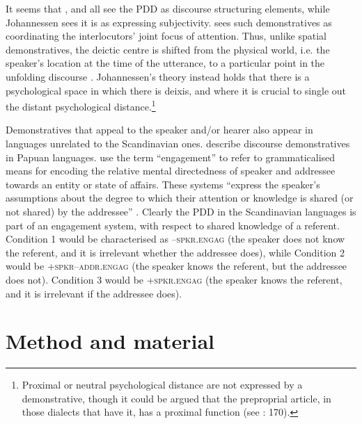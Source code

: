 \documentclass[output=paper,colorlinks,citecolor=brown]{langscibook}
\begin{document}
It seems that \citet{Himmelmann1996}, \citet{Diessel1999Book} and \citet{Lie2008,Lie2010} all see the PDD as discourse structuring elements, while Johannessen sees it is as expressing subjectivity. \citet{Diessel2006} sees such demonstratives as coordinating the interlocutors’ joint focus of attention. Thus, unlike spatial demonstratives, the deictic centre is shifted from the physical world, i.e. the speaker’s location at the time of the utterance, to a particular point in the unfolding discourse \citep[475]{Diessel2006}. Johannessen’s theory instead holds that there is a psychological space in which there is deixis, and where it is crucial to single out the distant psychological distance.\footnote{Proximal or neutral psychological distance are not expressed by a demonstrative, though it could be argued that the preproprial article, in those dialects that have it, has a proximal function (see \citealt{Johannessen2008}: 170).} 

Demonstratives that appeal to the speaker and/or hearer also appear in languages unrelated to the Scandinavian ones. \citet{SchapperRoque2011} describe discourse demonstratives in Papuan languages. \citet{EvansEtAl2018} use the term “engagement” to refer to grammaticalised means for encoding the relative mental directedness of speaker and addressee towards an entity or state of affairs. These systems “express the speaker’s assumptions about the degree to which their attention or knowledge is shared (or not shared) by the addressee” \citep[110]{EvansEtAl2018}. Clearly the PDD in the Scandinavian languages is part of an engagement system, with respect to shared knowledge of a referent. Condition 1 would be characterised as \textsc{–spkr.engag} (the speaker does not know the referent, and it is irrelevant whether the addressee does), while Condition 2 would be \textsc{+spkr–addr.engag} (the speaker knows the referent, but the addressee does not). Condition 3 would be \textsc{+spkr.engag} (the speaker knows the referent, and it is irrelevant if the addressee does). 

\section{Method and material}\label{sec:johannessen:3}
\end{document}
